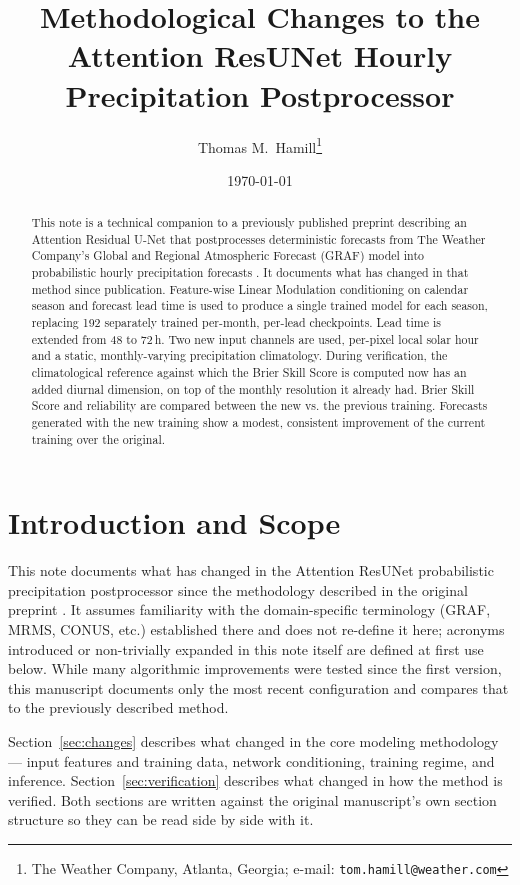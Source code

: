 \documentclass[11pt]{article}
\title{Methodological Changes to the Attention ResUNet Hourly\\
  Precipitation Postprocessor}
\author{Thomas M.\ Hamill\thanks{The Weather Company, Atlanta,
  Georgia; e-mail: \texttt{tom.hamill@weather.com}}}
\date{\today}
\begin{document}
\maketitle

\begin{abstract}
This note is a technical companion to a previously published preprint
describing an Attention Residual U-Net that postprocesses deterministic
forecasts from The Weather Company's Global and Regional Atmospheric
Forecast (GRAF) model into probabilistic hourly precipitation forecasts
\citep{hamill2026}. It documents what has changed in that method since
publication. Feature-wise Linear Modulation \citep[FiLM;][]{perez2017}
conditioning on calendar season and forecast lead time is
used to produce a single trained model for each season, replacing 192
separately trained per-month, per-lead checkpoints.  Lead time is extended
from 48 to 72\,h. Two new input channels are used, per-pixel local solar hour
and a static, monthly-varying precipitation climatology. During
verification, the climatological reference against which the Brier
Skill Score is computed now has an added diurnal dimension, on top of
the monthly resolution it already had.
Brier Skill Score and reliability are compared between
the new vs. the previous training.  Forecasts generated with the new
training show a modest, consistent improvement
of the current training over the original.
\end{abstract}

\section{Introduction and Scope}
\label{sec:intro}

This note documents what has changed in the Attention ResUNet
probabilistic precipitation postprocessor since the methodology
described in the original preprint \citep{hamill2026}. It assumes familiarity with
the domain-specific terminology (GRAF, MRMS, CONUS, etc.) established
there and does not re-define it here; acronyms introduced or
non-trivially expanded in this note itself are defined at first use
below.  While many algorithmic improvements were tested since the first 
version, this manuscript documents only the most recent configuration 
and compares that to the previously described method.

Section~\ref{sec:changes} describes what changed in the core modeling
methodology --- input features and training data, network conditioning,
training regime, and inference. Section~\ref{sec:verification}
describes what changed in how the method is verified. Both sections
are written against the original manuscript's own section structure so
they can be read side by side with it.
\end{document}
